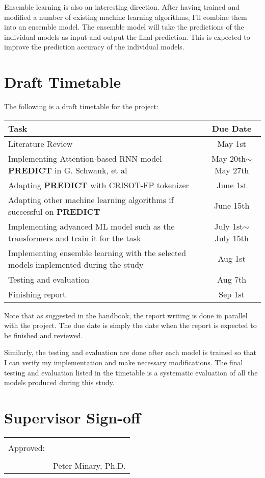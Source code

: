 \documentclass[12pt]{article}
\begin{document}
Ensemble learning is also an interesting direction. After having trained and modified a number of existing machine learning algorithms, I'll combine them into an ensemble model. The ensemble model will take the predictions of the individual models as input and output the final prediction. This is expected to improve the prediction accuracy of the individual models.

\section{Draft Timetable}

The following is a draft timetable for the project:

\begin{tabularx}{\textwidth}{X|c}
    \hline
    \textbf{Task} & \textbf{Due Date} \\
    \hline
    Literature Review & May 1st \\
    \hline
    Implementing Attention-based RNN model \textbf{PREDICT} in G. Schwank, et al\cite{schwankgeraldPredictingPrimeEditing2023} & May 20th$\sim$ May 27th \\
    \hline
    Adapting \textbf{PREDICT} with CRISOT-FP tokenizer & June 1st \\
    \hline
    Adapting other machine learning algorithms if successful on \textbf{PREDICT}\cite{liEasyPrimeMachineLearning2021,kimPredictingEfficiencyPrime2021a} & June 15th \\
    \hline
    Implementing advanced ML model such as the transformers and train it for the task & July 1st$\sim$ July 15th \\
    \hline
    Implementing ensemble learning with the selected models implemented during the study & Aug 1st \\
    \hline
    Testing and evaluation & Aug 7th \\
    \hline
    Finishing report & Sep 1st \\
    \hline
\end{tabularx}

Note that as suggested in the handbook, the report writing is done in parallel with the project. The due date is simply the date when the report is expected to be finished and reviewed.

Similarly, the testing and evaluation are done after each model is trained so that I can verify my implementation and make necessary modifications. The final testing and evaluation listed in the timetable is a systematic evaluation of all the models produced during this study.

\section{Supervisor Sign-off}

\begin{tabular}{@{}p{1in}p{4in}@{}}

\\
\\
Approved: & \\
&\hrulefill \\
& Peter Minary, Ph.D. \\
\end{tabular}

\newpage

\printbibliography
\end{document}
